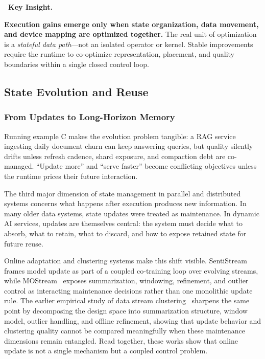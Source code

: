 \documentclass[acmsmall,screen,review]{acmart}
\newenvironment{keybox}{%
  \vspace{6pt}\noindent
  \begin{lrbox}{\keyboxcontent}
  \begin{minipage}{\dimexpr\linewidth-2\fboxsep-2\fboxrule\relax}
  \raggedright
  \textbf{\faLightbulbO\ \textcolor{keyborder}{Key Insight.}}\par\smallskip
}{%
  \end{minipage}
  \end{lrbox}
  \fcolorbox{keyborder}{keybg}{\usebox{\keyboxcontent}}%
  \vspace{6pt}%
}
\newcommand{\sysproblem}{state management in parallel and distributed systems\xspace}
\begin{document}
\begin{keybox}
\textbf{Execution gains emerge only when state organization, data movement, and device mapping are optimized together.} The real unit of optimization is a \emph{stateful data path}---not an isolated operator or kernel. Stable improvements require the runtime to co-optimize representation, placement, and quality boundaries within a single closed control loop.
\end{keybox}

\subsection{State Evolution and Reuse}

\subsubsection{From Updates to Long-Horizon Memory}

Running example C makes the evolution problem tangible: a RAG service ingesting daily document churn can keep answering queries, but quality silently drifts unless refresh cadence, shard exposure, and compaction debt are co-managed. ``Update more'' and ``serve faster'' become conflicting objectives unless the runtime prices their future interaction.

The third major dimension of \sysproblem concerns what happens after execution produces new information. In many older data systems, state updates were treated as maintenance. In dynamic AI services, updates are themselves central: the system must decide what to absorb, what to retain, what to discard, and how to expose retained state for future reuse.

Online adaptation and clustering systems make this shift visible. SentiStream~\cite{wu2023sentistream} frames model update as part of a coupled co-training loop over evolving streams, while MOStream~\cite{wang2024mostream} exposes summarization, windowing, refinement, and outlier control as interacting maintenance decisions rather than one monolithic update rule. The earlier empirical study of data stream clustering~\cite{wang2023dscstudy} sharpens the same point by decomposing the design space into summarization structure, window model, outlier handling, and offline refinement, showing that update behavior and clustering quality cannot be compared meaningfully when these maintenance dimensions remain entangled. Read together, these works show that online update is not a single mechanism but a coupled control problem.
\end{document}

